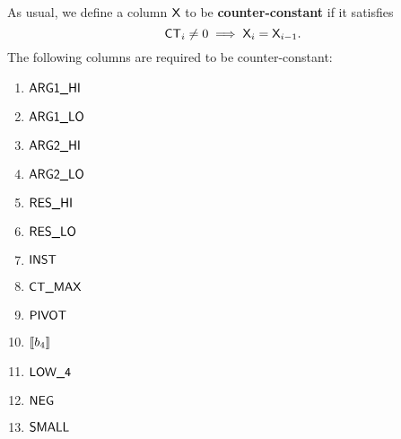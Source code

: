\noindent As usual, we define a column $\textsf{X}$ to be \textbf{counter-constant} if it satisfies
\[
	\textsf{CT}_{i} \neq 0 \implies \textsf{X}_{i} = \textsf{X}_{i - 1}.
\]
The following columns are required to be counter-constant:
\begin{multicols}{4}
\begin{enumerate}
	\item $\textsf{ARG}\textsf{1}\textsf{\_HI}$
	\item $\textsf{ARG}\textsf{1}\textsf{\_LO}$
	\item $\textsf{ARG}\textsf{2}\textsf{\_HI}$
	\item $\textsf{ARG}\textsf{2}\textsf{\_LO}$
	\item $\textsf{RES}\textsf{\_HI}$
	\item $\textsf{RES}\textsf{\_LO}$
	\item $\textsf{INST}$
	\item $\textsf{CT\_MAX}$
	\item $\textsf{PIVOT}$
	\item $[\![b_4]\!]$
	\item $\textsf{LOW\_4}$
	\item $\textsf{NEG}$
	\item $\textsf{SMALL}$
\end{enumerate}
\end{multicols}
